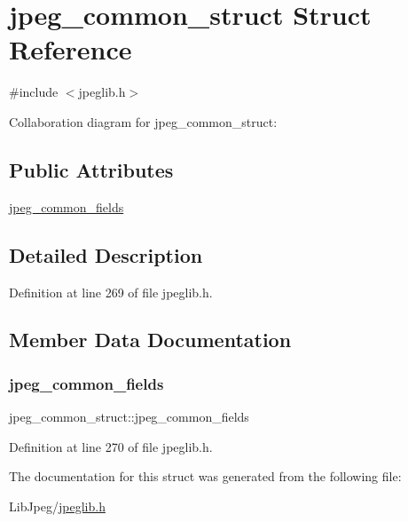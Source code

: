 \hypertarget{structjpeg__common__struct}{}\section{jpeg\+\_\+common\+\_\+struct Struct Reference}
\label{structjpeg__common__struct}


{\ttfamily \#include $<$jpeglib.\+h$>$}



Collaboration diagram for jpeg\+\_\+common\+\_\+struct\+:
\subsection*{Public Attributes}
\begin{DoxyCompactItemize}
\item 
\mbox{\hyperlink{structjpeg__common__struct_af0328603f836658f65d39679f6bbfa7a}{jpeg\+\_\+common\+\_\+fields}}
\end{DoxyCompactItemize}


\subsection{Detailed Description}


Definition at line 269 of file jpeglib.\+h.



\subsection{Member Data Documentation}
\mbox{\label{structjpeg__common__struct_af0328603f836658f65d39679f6bbfa7a}} 
\subsubsection{\texorpdfstring{jpeg\_common\_fields}{jpeg\_common\_fields}}
{\footnotesize\ttfamily jpeg\+\_\+common\+\_\+struct\+::jpeg\+\_\+common\+\_\+fields}



Definition at line 270 of file jpeglib.\+h.



The documentation for this struct was generated from the following file\+:\begin{DoxyCompactItemize}
\item 
Lib\+Jpeg/\mbox{\hyperlink{jpeglib_8h}{jpeglib.\+h}}\end{DoxyCompactItemize}
